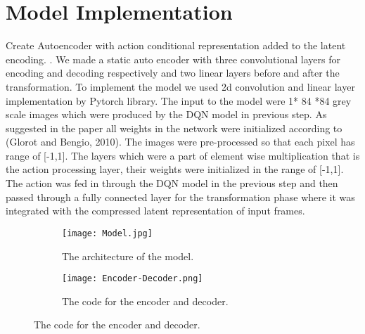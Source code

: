\documentclass[12pt, a4paper, oneside]{report}
\begin{document}
        \section{Model Implementation}
            \par Create Autoencoder with action conditional representation added to the latent encoding. . We made a static auto encoder with three convolutional layers for encoding and decoding respectively and two linear layers before and after the transformation. To implement the model we used 2d convolution and linear layer implementation by Pytorch library. The input to the model were 1* 84 *84 grey scale images which were produced by the DQN model in previous step. As suggested in the paper all weights in the network were initialized according to (Glorot and Bengio, 2010). The images were pre-processed so that each pixel has range of [-1,1]. The layers which were a part of element wise multiplication that is the action processing layer, their weights were initialized in the range of [-1,1]. The action was fed in through the DQN model in the previous step and then passed through a fully connected layer for the transformation phase where it was integrated with the compressed latent representation of input frames.
            \begin{figure}[h!]
                \centering
                \begin{subfigure}[b]{\textwidth}
                    \centering
                    \texttt{[image: Model.jpg]}
                    \caption{The architecture of the model.}
                \end{subfigure}
                \hfill
                \begin{subfigure}[b]{\textwidth}
                    \centering
                    \texttt{[image: Encoder-Decoder.png]}
                    \caption{The code for the encoder and decoder.}
                \end{subfigure}
            \end{figure}
\end{document}
